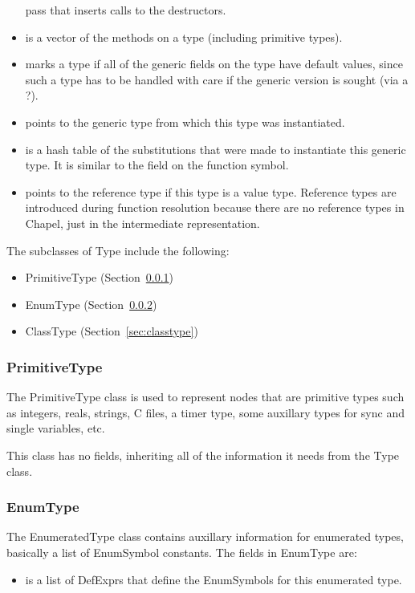 \documentclass[10pt]{article}
\begin{document}
\begin{itemize}
  pass that inserts calls to the destructors.
\item {} is a vector of the methods on a
  type (including primitive types).
\item {} marks a type if all of the generic
  fields on the type have default values, since such a type has to be
  handled with care if the generic version is sought (via a ?).
\item {} points to the generic type from
  which this type was instantiated.
\item {} is a hash table of the
  substitutions that were made to instantiate this generic type.  It
  is similar to the field on the function symbol.
\item {} points to the reference type if this
  type is a value type.  Reference types are introduced during
  function resolution because there are no reference types in Chapel,
  just in the intermediate representation.
\end{itemize}

The subclasses of Type include the following:
\begin{itemize}
\item PrimitiveType (Section~\ref{sec:primitivetype})
\item EnumType (Section~\ref{sec:enumtype})
\item ClassType (Section~\ref{sec:classtype})
\end{itemize}

\subsubsection{PrimitiveType}
\label{sec:primitivetype}

The PrimitiveType class is used to represent nodes that are primitive
types such as integers, reals, strings, C files, a timer type, some
auxillary types for sync and single variables, etc.

This class has no fields, inheriting all of the information it needs
from the Type class.

\subsubsection{EnumType}
\label{sec:enumtype}

The EnumeratedType class contains auxillary information for enumerated
types, basically a list of EnumSymbol constants.  The fields in
EnumType are:
\begin{itemize}
\item {} is a list of DefExprs that define the
  EnumSymbols for this enumerated type.
\end{itemize}
\end{document}
